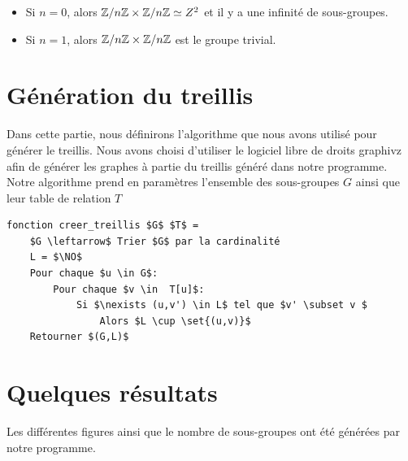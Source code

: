 \documentclass[12pt]{article}
\begin{document}
\begin{remark}
	\hfill
	\begin{itemize}
		\item Si $n = 0$, alors $\mathbb Z/n\mathbb Z \times \mathbb Z/n\mathbb Z \simeq Z^2$ et il y a une infinité de sous-groupes.
		\item Si $n = 1$, alors $\mathbb Z/n\mathbb Z \times \mathbb Z/n\mathbb Z$ est le groupe trivial.
	\end{itemize}

\end{remark}
\newpage
\section{Génération du treillis}
Dans cette partie, nous définirons l'algorithme que nous avons utilisé
pour générer le treillis. Nous avons choisi d'utiliser le logiciel libre de droits graphivz afin
de générer les graphes à partie du treillis généré dans notre programme.\\
Notre algorithme prend en paramètres l'ensemble des sous-groupes $G$ ainsi que leur table de relation
$T$

\begin{lstlisting}
fonction creer_treillis $G$ $T$ =
	$G \leftarrow$ Trier $G$ par la cardinalité
	L = $\NO$
	Pour chaque $u \in G$:
		Pour chaque $v \in  T[u]$:
			Si $\nexists (u,v') \in L$ tel que $v' \subset v $
				Alors $L \cup \set{(u,v)}$
	Retourner $(G,L)$
\end{lstlisting}

\newpage
\section{Quelques résultats}
Les différentes figures ainsi que le nombre de sous-groupes ont été générées par
notre programme.
\end{document}
